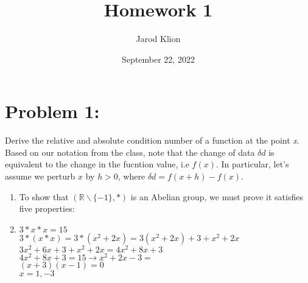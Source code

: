 \documentclass{article}
\title{Homework 1}
\author{Jarod Klion}
\date{September 22, 2022}
\begin{document}
\maketitle %


\section*{Problem 1:}
Derive the relative and absolute condition number of a function at the point \emph{x}. Based on our notation from the class, note that the change of data $\delta d$ is equivalent to the change in the fucntion value, i.e $f(x)$. In particular, let's assume we perturb $x$ by $h > 0$, where $\delta d = f(x + h) - f(x)$.
\begin{enumerate}[label=(\alph*)]
	\item To show that $(\mathbb{R}\backslash\{-1\},*)$ is an Abelian group, we must prove it satisfies five properties:
		 
	\item $3 * x * x = 15$ \\
	         $3 * (x * x) = 3 * (x^2 + 2x) = 3(x^2+2x) + 3 + x^2 + 2x$ \\
	         $3x^2 + 6x + 3 + x^2 + 2x = 4x^2 + 8x + 3$ \\
	         $4x^2 + 8x +3 = 15 \rightarrow x^2 + 2x - 3 =  $ \\
	         $(x+3)(x-1) = 0$ \\
	         $ x=1,-3$
\end{enumerate}
\clearpage %
\end{document}
